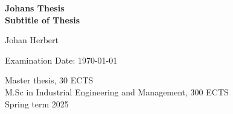 \documentclass[%
a4paper,							
11pt,								
bibliography=totoc,						
abstracton=true					
]
{scrartcl}
\theoremstyle{plain}
\theoremstyle{definition}
\theoremstyle{remark}
\newcommand{\1}{\mathbbm{1}}
\begin{document}
\begin{titlepage}
\begin{center}
    \end{center}
\vspace*{5cm}
\begin{center}
    {%
        \color{white}
        \noindent
        \Huge
        \bfseries 
        \sffamily
        Johans Thesis
    }\\[1em]
    {%
        \color{white}
        \noindent
        \Large
        \bfseries 
        \sffamily
        Subtitle of Thesis
    }%
\end{center}
\renewcommand{\thefootnote}{\fnsymbol{footnote}}

\begin{center}
    \color{white}
    \large
    Johan Herbert%
    \footnotemark[2]{}
    \hspace{2em}
    \hspace{2em}
\end{center}
\begin{center}
    \color{white}
    \large
    Examination Date: \today
\end{center}
\vfill
\begin{center}
    Master thesis, 30 ECTS\\
    M.Sc in Industrial Engineering and Management, 300 ECTS\\
    Spring term 2025
\end{center}


\renewcommand{\thefootnote}{\arabic{footnote}}


\thispagestyle{empty}
\end{titlepage}
\end{document}
